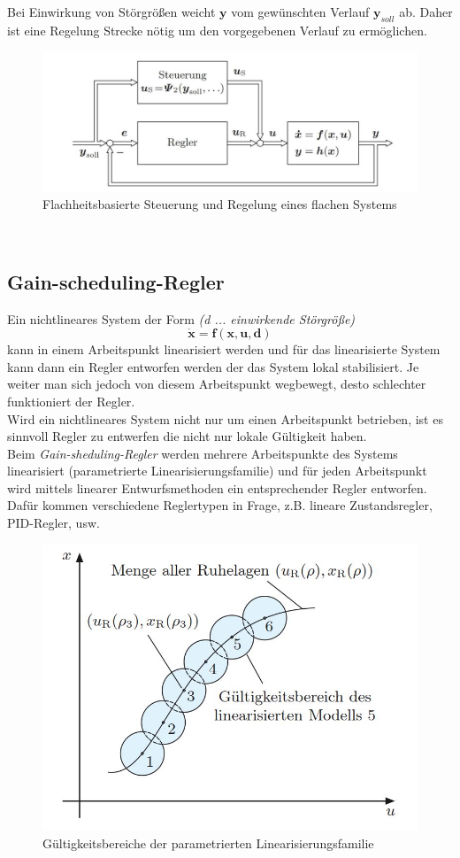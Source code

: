 		Bei Einwirkung von Störgrößen weicht $ \bm{y}$ vom gewünschten Verlauf $ \bm{y}_{soll} $ ab. Daher ist eine Regelung Strecke nötig um den vorgegebenen Verlauf zu ermöglichen.
		\begin{figure}[h]
			\centering
			\includegraphics[width=0.6\linewidth]{./pics/re/flach}
			\caption{Flachheitsbasierte Steuerung und Regelung eines flachen Systems}
			\label{}
		\end{figure}
		\leavevmode \\
	\subsection{Gain-scheduling-Regler}
		Ein nichtlineares System der Form \textit{(d ... einwirkende Störgröße)}
		\[\bm{\dot{x}} = \bm{f}(\bm{x},\bm{u},\bm{d}) \]
		kann in einem Arbeitspunkt linearisiert werden und für das linearisierte System kann dann ein Regler entworfen werden der das System lokal stabilisiert. Je weiter man sich jedoch von diesem Arbeitspunkt wegbewegt, desto schlechter funktioniert der Regler.\\
		Wird ein nichtlineares System nicht nur um einen Arbeitspunkt betrieben, ist es sinnvoll Regler zu entwerfen die nicht nur lokale Gültigkeit haben.\\
		Beim \textit{Gain-sheduling-Regler} werden mehrere Arbeitspunkte des Systems linearisiert (parametrierte Linearisierungsfamilie) und für jeden Arbeitspunkt wird mittels linearer Entwurfsmethoden ein entsprechender Regler entworfen. Dafür kommen verschiedene Reglertypen in Frage, z.B. lineare Zustandsregler, PID-Regler, usw.
		\begin{figure}[h]
			\centering
			\includegraphics[width=0.5\linewidth]{./pics/re/gain}
			\caption{Gültigkeitsbereiche der parametrierten Linearisierungsfamilie}
		\end{figure}
